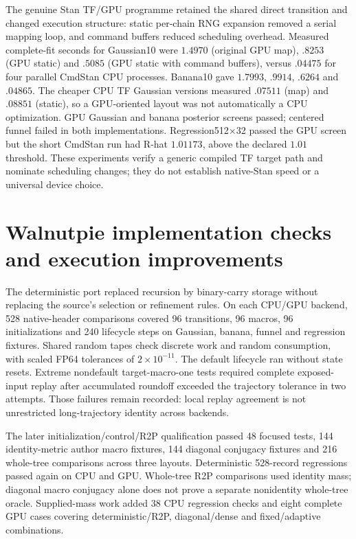 The genuine Stan TF/GPU programme retained the shared direct transition and
changed execution structure: static per-chain RNG expansion removed a
serial mapping loop, and command buffers reduced scheduling overhead.
Measured complete-fit seconds for Gaussian10 were $1.4970$ (original GPU
map), $.8253$ (GPU static) and $.5085$ (GPU static with command buffers),
versus $.04475$ for four parallel CmdStan CPU processes. Banana10 gave
$1.7993$, $.9914$, $.6264$ and $.04865$. The cheaper CPU TF Gaussian
versions measured $.07511$ (map) and $.08851$ (static), so a GPU-oriented
layout was not automatically a CPU optimization. GPU Gaussian and banana
posterior screens passed; centered funnel failed in both implementations.
Regression512$\times$32 passed the GPU screen but the short CmdStan run
had R-hat $1.01173$, above the declared $1.01$ threshold. These experiments
verify a generic compiled TF target path and nominate scheduling changes;
they do not establish native-Stan speed or a universal device choice.

\section[Walnutpie validation and execution]{Walnutpie implementation checks and execution improvements}
\label{sec:sw-walnut-validation}

The deterministic port replaced recursion by binary-carry storage without
replacing the source's selection or refinement rules. On each CPU/GPU
backend, 528 native-header comparisons covered 96 transitions, 96 macros,
96 initializations and 240 lifecycle steps on Gaussian, banana, funnel
and regression fixtures. Shared random tapes check discrete work and
random consumption, with scaled FP64 tolerances of $2\times10^{-11}$.
The default lifecycle ran without state resets. Extreme nondefault
target-macro-one tests required complete exposed-input replay after
accumulated roundoff exceeded the trajectory tolerance in two attempts.
Those failures remain recorded: local replay agreement is not unrestricted
long-trajectory identity across backends.

The later initialization/control/R2P qualification passed 48 focused tests,
144 identity-metric author macro fixtures, 144 diagonal conjugacy fixtures
and 216 whole-tree comparisons across three layouts. Deterministic
528-record regressions passed again on CPU and GPU. Whole-tree R2P
comparisons used identity mass; diagonal macro conjugacy alone does not
prove a separate nonidentity whole-tree oracle. Supplied-mass work added
38 CPU regression checks and eight complete GPU cases covering
deterministic/R2P, diagonal/dense and fixed/adaptive combinations.


